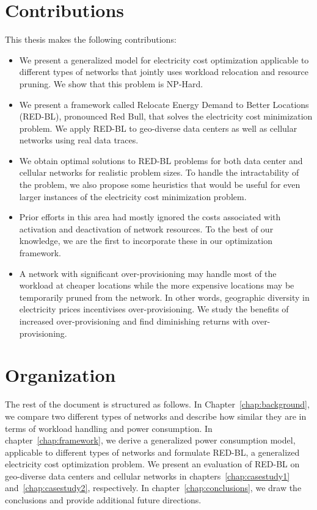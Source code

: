 \section{Contributions} This thesis makes the following contributions:

\begin{itemize}
\item We present a generalized model for electricity cost optimization applicable to different types of networks that jointly uses workload relocation and resource pruning. We show that this problem is NP-Hard.
\item We present a framework called Relocate Energy Demand to Better Locations (RED-BL), pronounced Red Bull, that solves the electricity cost minimization problem. We apply RED-BL to geo-diverse data centers as well as cellular networks using real data traces.
\item We obtain optimal solutions to RED-BL problems for both data center and cellular networks for realistic problem sizes. To handle the intractability of the problem, we also propose some heuristics that would be useful for even larger instances of the electricity cost minimization problem. 
\item Prior efforts in this area had mostly ignored the costs associated with activation and deactivation of network resources. To the best of our knowledge, we are the first to incorporate these in our optimization framework.
\item A network with significant over-provisioning may handle most of the workload at cheaper locations while the more expensive locations may be temporarily pruned from the network. In other words, geographic diversity in electricity prices incentivises over-provisioning. We study the benefits of increased over-provisioning and find diminishing returns with over-provisioning.
\end{itemize}

\section{Organization} The rest of the document is structured as follows. In Chapter~\ref{chap:background}, we compare two different types of networks and describe how similar they are in terms of workload handling and power consumption. In chapter~\ref{chap:framework}, we derive a generalized power consumption model, applicable to different types of networks and formulate RED-BL, a generalized electricity cost optimization problem. We present an evaluation of RED-BL on geo-diverse data centers and cellular networks in chapters~\ref{chap:casestudy1} and~\ref{chap:casestudy2}, respectively. In chapter~\ref{chap:conclusions}, we draw the conclusions and provide additional future directions.